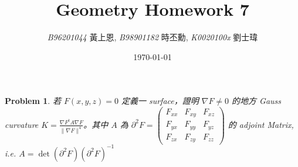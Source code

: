 \documentclass[10pt,a4paper]{article}
\newcommand{\LiHei}{\CJKfamily{lh}}
\newcounter{theProblemCounter}
\newtheorem{problem}[theProblemCounter]{Problem}
\begin{document}
\title{{Geometry Homework 7}}
\author{{\it{B96201044}} {\LiHei 黃上恩}, {\it{B98901182}} {\LiHei 時丕勳}, {\it{K0020100x}} {\LiHei 劉士瑋}}
\date{\today}
\maketitle

\newcommand{\bx}{\mathbb{X}}
\newcommand{\sech}{\mbox{sech}}
\setcounter{theProblemCounter}{1}
\begin{problem}
若 $F(x, y, z)=0$ 定義一 surface，證明 $\nabla F\neq 0$ 的地方 Gauss curvature $K=\frac{\nabla F^t A\nabla F}{\|\nabla F\|^4}$。其中 $A$ 為 $\partial^2 F=\left(
\begin{array}{ccc}
F_{xx} & F_{xy} & F_{xz} \\
F_{yx} & F_{yy} & F_{yz} \\
F_{zx} & F_{zy} & F_{zz}\end{array}
\right)$ 的 adjoint Matrix, i.e. $A=\det(\partial^2F)(\partial^2F)^{-1}$ %
\end{problem}
\end{document}
